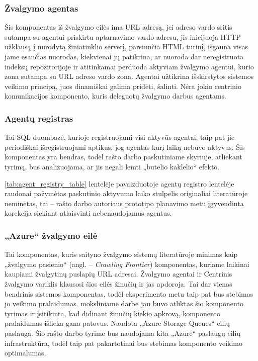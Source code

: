  \subsubsection{Žvalgymo agentas}

Šis komponentas iš žvalgymo eilės ima URL adresą, jei adreso vardo sritis sutampa su agentui priskirtu aptarnavimo vardo adresu, jis inicijuoja HTTP užklausą į nurodytą žiniatinklio serverį, parsiunčia HTML turinį, išgauna visas jame esančias nuorodas, kiekvienai jų patikrina, ar nuoroda dar neregistruota indeksų repozitorijoje ir atitinkamai perduoda aktyviam žvalgymo agentui, kurio zona sutampa su URL adreso vardo zona. Agentai užtikrina išskirstytos sistemos veikimo principą, juos dinamiškai galima pridėti, šalinti. Nėra jokio centrinio komunikacijos komponento, kuris deleguotų žvalgymo darbus agentams.

 \subsubsection{Agentų registras}
 
 Tai SQL duombazė, kurioje registruojami visi aktyvūs agentai, taip pat jie periodiškai išregistruojami aptikus, jog agentas kurį laiką nebuvo aktyvus. Šis komponentas yra bendras, todėl rašto darbo paskutiniame skyriuje, atliekant tyrimą, bus analizuojama, ar jis negali lemti „butelio kaklelio“ efekto.
 
 
 
 \ref{tab:agent_registry_table} lentelėje pavaizduotoje agentų registro lentelėje raudonai pažymėtas paskutinio aktyvumo laiko stulpelis originaliai \cite{MercedCloudBasedWebCrawler} literatūroje neminėtas, tai -- rašto darbo autoriaus prototipo planavimo metu įgyvendinta korekcija siekiant atlaisvinti nebenaudojamus agentus.
 
 \subsubsection{„Azure“ žvalgymo eilė}
 
 Tai komponentas, kuris saityno žvalgymo sistemų literatūroje minimas kaip „žvalgymo pasienio“ (angl. -- \textit{Crawling Frontier}) komponentas, kuriame laikinai kaupiami žvalgytinų puslapių URL adresai. Žvalgymo agentai ir Centrinis žvalgymo variklis klausosi šios eilės žinučių ir jas apdoroja. Tai dar vienas bendrinis sistemos komponentas, todėl eksperimento metu taip pat bus stebimas jo veikimo pralaidumas. \cite{MercedCloudBasedWebCrawler} moksliniame darbe jau buvo atliktas šio komponento tyrimas ir įsitikinta, kad didinant žinučių kiekio apkrovą, komponento pralaidumas išlieka gana patovus. Naudota „Azure Storage Queues“ eilių paslauga. Šio rašto darbo tyrime bus naudojama kita „Azure“ paslaugų eilių infrastruktūra, todėl taip pat pakartotinai bus stebimas komponento veikimo optimalumas.
 
